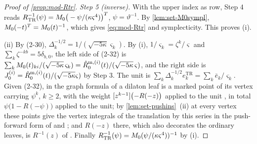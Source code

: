 \begin{proof}[Proof of \cref{prop:mod-Rtr}]
\emph{Step 5 (inverse).} With the upper index as row, Step 4 reads $R_{\mathrm{TR}}^{-1}(\psi)=M_{0}\big(-\psi/(\kappa\varsigma^4)\big)^T$, $\psi=\vartheta^{-1}$. By \cref{lem:set-M0sympl}, $M_{0}(-t)^T=M_{0}(t)^{-1}$, which gives \eqref{eq:mod-Rtr} and symplecticity. This proves (i).

(ii) By (2-30), $\Delta_k^{-1/2}=1/(\sqrt{-5\kappa}\varsigma_k)$. By (i), $1/\varsigma_k=\zeta^k/\varsigma$ and $\sum_k\zeta^{-kb}=5\delta_{b,0}$, the left side of (2-32) is $\sum_kM_{0}(t)_{ki}/(\sqrt{-5\kappa}\,\varsigma_k)=\hat{R}^{\mathrm m,(i)}_0(t)/(\sqrt{-5\kappa}\,\varsigma)$, and the right side is $J^{(i)}_0=\hat{R}^{\mathrm m,(i)}_0(t)/(\sqrt{-5\kappa}\varsigma)$ by Step 3. The unit is $\sum_k\Delta_k^{-1/2}e^{\mathrm{TR}}_k=\sum_k\bar e_k/\varsigma_k$. Given (2-32), in the graph formula of \cite[Thm.~4.1]{DuninBarkowski:2012bw} a dilaton leaf is a marked point of its vertex carrying $\psi^k$, $k\geq 2$, with the weight $[z^{k-1}]\bigl(-R(-z)\bigr)$ applied to the unit \cite[\S2.3]{DuninBarkowski:2012bw}, in total $\psi\bigl(1-R(-\psi)\bigr)$ applied to the unit; by \cref{lem:set-pushins}~(ii) at every vertex these points give the vertex integrals of the translation by this series in the push-forward form of \cite[Def.~2.5]{PPZ15} and \cite[\S2.3]{Dunin-Barkowski:2015caa}; and $R(-z)$ there, which also decorates the ordinary leaves, is $R^{-1}(z)$ of \cite[\S2.3]{Dunin-Barkowski:2015caa}. Finally $R_{\mathrm{TR}}^{-1}(\psi)=M_{0}(\psi/(\kappa\varsigma^4))^{-1}$ by (i).
\end{proof}

